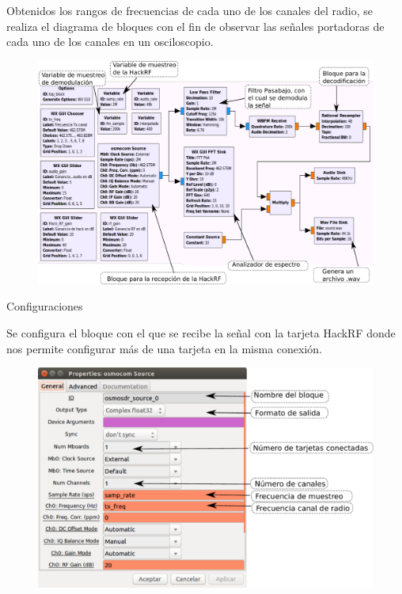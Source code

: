 \begin{frame}{}

Obtenidos los rangos de frecuencias de cada uno de los canales del radio, se realiza el diagrama de bloques con el fin de observar las señales portadoras de cada uno de los canales en un osciloscopio.

\begin{figure}[H]
\centering
\vspace{-3mm}
\includegraphics[width=.9\textwidth]{parte3/lab10/pdf/lab10_8.pdf}
\end{figure}

\end{frame}

\begin{frame}{Configuraciones}

Se configura el bloque con el que se recibe la señal con la tarjeta HackRF donde nos permite configurar más de una tarjeta en la misma conexión.

\begin{figure}[H]
\centering
\vspace{-3mm}
\includegraphics[width=.8\textwidth]{parte3/lab10/pdf/lab10_9.pdf}
\end{figure}

\end{frame}

